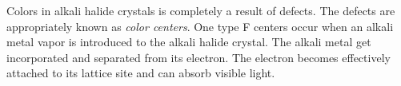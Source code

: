 Colors in alkali halide crystals is completely a result of defects. The defects
are appropriately known as \textit{color centers}. One type F centers occur when
an alkali metal vapor is introduced to the alkali halide crystal. The alkali
metal get incorporated and separated from its electron. The electron becomes
effectively attached to its lattice site and can absorb visible light.
